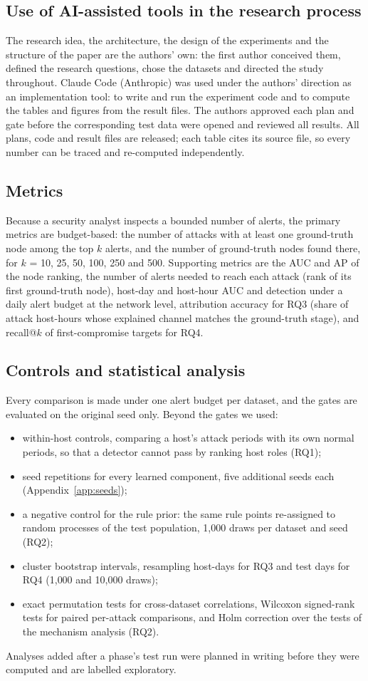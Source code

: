 \documentclass[acmlarge,screen,review]{acmart}
\begin{document}
\subsection{Use of AI-assisted tools in the research process}
The research idea, the architecture, the design of the experiments and the structure of the paper are the
authors' own: the first author conceived them, defined the research questions, chose the datasets and directed the
study throughout. Claude Code (Anthropic) was used under the authors' direction as an implementation tool: to write
and run the experiment code and to compute the tables and figures from the result files. The authors approved each plan and gate before the corresponding test data
were opened and reviewed all results. All plans, code and result files are released; each table cites its source
file, so every number can be traced and re-computed independently.

\subsection{Metrics}
Because a security analyst inspects a bounded number of alerts, the primary metrics are budget-based: the number of
attacks with at least one ground-truth node among the top $k$ alerts, and the number of ground-truth nodes found
there, for $k$ = 10, 25, 50, 100, 250 and 500. Supporting metrics are the AUC and AP of the node ranking, the number of
alerts needed to reach each attack (rank of its first ground-truth node), host-day and host-hour AUC and detection
under a daily alert budget at the network level, attribution accuracy for RQ3 (share of attack host-hours whose
explained channel matches the ground-truth stage), and recall@$k$ of first-compromise targets for RQ4.

\subsection{Controls and statistical analysis}
Every comparison is made under one alert budget per dataset, and the gates are evaluated on the original seed only.
Beyond the gates we used:
\begin{itemize}
\item within-host controls, comparing a host's attack periods with its own normal periods, so that a detector
cannot pass by ranking host roles (RQ1);
\item seed repetitions for every learned component, five additional seeds each (Appendix~\ref{app:seeds});
\item a negative control for the rule prior: the same rule points re-assigned to random processes of the test
population, 1{,}000 draws per dataset and seed (RQ2);
\item cluster bootstrap intervals, resampling host-days for RQ3 and test days for RQ4 (1{,}000 and 10{,}000
draws);
\item exact permutation tests for cross-dataset correlations, Wilcoxon signed-rank tests for paired per-attack
comparisons, and Holm correction over the tests of the mechanism analysis (RQ2).
\end{itemize}
Analyses added after a phase's test run were planned in writing before they were computed and are labelled
exploratory.
\end{document}
